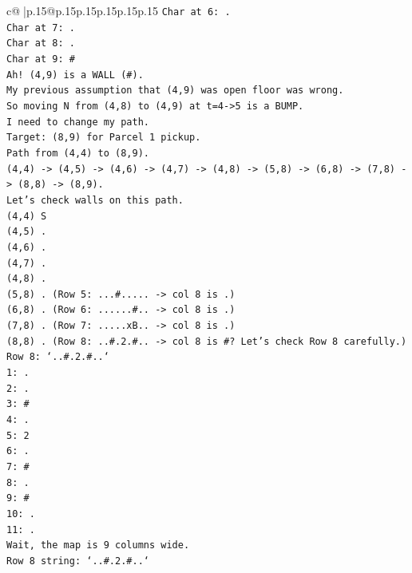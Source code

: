 \documentclass{article}
\begin{document}
{\begin{supertabular}{c@{$\;$}|p{.15\linewidth}@{}p{.15\linewidth}p{.15\linewidth}p{.15\linewidth}p{.15\linewidth}p{.15\linewidth}}
{{{\texttt{Char at 6: .} \\
\texttt{Char at 7: .} \\
\texttt{Char at 8: .} \\
\texttt{Char at 9: \#} \\
\texttt{Ah! (4,9) is a WALL (\#).} \\
\texttt{My previous assumption that (4,9) was open floor was wrong.} \\
\texttt{So moving N from (4,8) to (4,9) at t=4{-}>5 is a BUMP.} \\
\texttt{I need to change my path.} \\
\texttt{Target: (8,9) for Parcel 1 pickup.} \\
\texttt{Path from (4,4) to (8,9).} \\
\texttt{(4,4) {-}> (4,5) {-}> (4,6) {-}> (4,7) {-}> (4,8) {-}> (5,8) {-}> (6,8) {-}> (7,8) {-}> (8,8) {-}> (8,9).} \\
\texttt{Let's check walls on this path.} \\
\texttt{(4,4) S} \\
\texttt{(4,5) .} \\
\texttt{(4,6) .} \\
\texttt{(4,7) .} \\
\texttt{(4,8) .} \\
\texttt{(5,8) . (Row 5: ...\#..... {-}> col 8 is .)} \\
\texttt{(6,8) . (Row 6: ......\#.. {-}> col 8 is .)} \\
\texttt{(7,8) . (Row 7: .....xB.. {-}> col 8 is .)} \\
\texttt{(8,8) . (Row 8: ..\#.2.\#.. {-}> col 8 is \#? Let's check Row 8 carefully.)} \\
\texttt{Row 8: `..\#.2.\#..`} \\
\texttt{1: .} \\
\texttt{2: .} \\
\texttt{3: \#} \\
\texttt{4: .} \\
\texttt{5: 2} \\
\texttt{6: .} \\
\texttt{7: \#} \\
\texttt{8: .} \\
\texttt{9: \#} \\
\texttt{10: .} \\
\texttt{11: .} \\
\texttt{Wait, the map is 9 columns wide.} \\
\texttt{Row 8 string: `..\#.2.\#..`} \\
}}}
\end{supertabular}}
\end{document}
